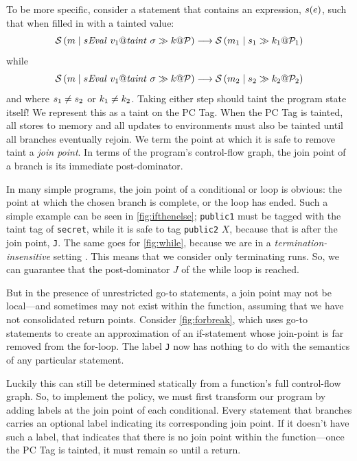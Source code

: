 \documentclass[acmsmall,review,anonymous]{acmart}\settopmatter{printfolios=true,printccs=false,printacmref=false}
\begin{document}
To be more specific, consider a statement that contains an expression, \(s(e)\),
such that when filled in with a tainted value:
%
\[\mathcal{S}\left(m \mid s\mathit{Eval} ~ v_1@\mathit{taint} ~ \sigma \gg k @ \mathcal{P}\right) \longrightarrow
\mathcal{S}\left(m_1 \mid s_1 \gg k_1 @ \mathcal{P}_1\right)\]
%
while
%
\[\mathcal{S}\left(m \mid s\mathit{Eval} ~ v_1@\mathit{taint} ~ \sigma \gg k @ \mathcal{P}\right) \longrightarrow
\mathcal{S}\left(m_2 \mid s_2 \gg k_2 @ \mathcal{P}_2\right)\]
%
and where \(s_1 \not = s_2\) or \(k_1 \not = k_2\). Taking either step
should taint the program state itself! We represent this as a taint on the PC Tag.
When the PC Tag is tainted, all stores to memory and all updates to environments must
also be tainted until all branches eventually rejoin.
We term the point at which it is safe to remove taint a {\it join point}.
In terms of the program's control-flow graph, the
join point of a branch is its immediate post-dominator.

In many simple programs, the join point of a conditional or loop is obvious:
the point at which the chosen branch is complete, or the loop has ended.
Such a simple example can be seen in \cref{fig:ifthenelse}; {\tt public1} must be
tagged with the taint tag of {\tt secret}, while it is safe to tag {\tt public2}
\(X\), because that is after the join point, {\tt J}. The same goes for \cref{fig:while},
because we are in a {\em termination-insensitive} setting \cite{}. This means that we
consider only terminating runs. So, we can guarantee that the post-dominator \(J\)
of the while loop is reached.

But in the presence of unrestricted go-to statements, a join point may not be
local---and sometimes may not exist within the function, assuming that we have not
consolidated return points. Consider \cref{fig:forbreak}, which
uses go-to statements to create an approximation of an if-statement whose join-point
is far removed from the for-loop. The label {\tt J} now has nothing to do with the
semantics of any particular statement.

Luckily this can still be determined statically from a function's full
control-flow graph. So, to implement the policy, we must first transform our program
by adding labels at the join point of each conditional.
Every statement that branches carries an optional label indicating its corresponding
join point. If it doesn't have such
a label, that indicates that there is no join point within the function---once the PC Tag is tainted,
it must remain so until a return.
\end{document}
